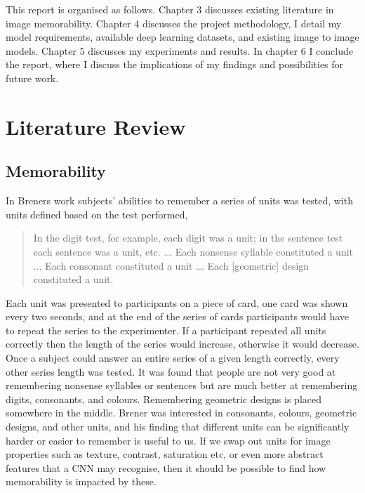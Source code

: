 \documentclass{UoYCSproject}
\begin{document}
This report is organised as follows. Chapter 3 discusses existing literature in image memorability. Chapter 4 discusses the project methodology, I detail my model requirements, available deep learning datasets, and existing image to image models. Chapter 5 discusses my experiments and results. In chapter 6 I conclude the report, where I discuss the implications of my findings and possibilities for future work.    

\chapter{Literature Review}


\section{Memorability}


In Breners work \cite{BrenerMemorySpan} subjects' abilities to remember a series of units was tested, with units defined based on the test performed, 
\begin{quote}
    In the digit test, for example, each digit was a unit; in the sentence test each sentence was a unit, etc. ... Each nonsense syllable constituted a unit ... Each consonant constituted a unit ... Each [geometric] design constituted a unit. \cite[p.468]{BrenerMemorySpan}
\end{quote}

Each unit was presented to participants on a piece of card, one card was shown every two seconds, and at the end of the series of cards participants would have to repeat the series to the experimenter. If a participant repeated all units correctly then the length of the series would increase, otherwise it would decrease. Once a subject could answer an entire series of a given length correctly, every other series length was tested. It was found that people are not very good at remembering nonsense syllables or sentences but are much better at remembering digits, consonants, and colours. Remembering geometric designs is placed somewhere in the middle. Brener was interested in consonants, colours, geometric designs, and other units, and his finding that different units can be significantly harder or easier to remember is useful to us. If we swap out units for image properties such as texture, contrast, saturation etc, or even more abstract features that a CNN may recognise, then it should be possible to find how memorability is impacted by these. 
 
\end{document}
